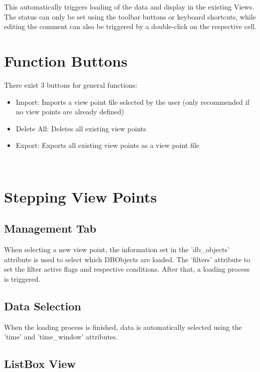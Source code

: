 This automatically triggers loading of the data and display in the existing Views. \\

The status can only be set using the toolbar buttons or keyboard shortcuts, while editing the comment can also be triggered by a double-click on the respective cell.

\section{Function Buttons}

There exist 3 buttons for general functions:

\begin{itemize}  
\item Import: Imports a view point file selected by the user (only recommended if no view points are already defined)
\item Delete All: Deletes all existing view points
\item Export: Exports all existing view points as a view point file
\end{itemize}
\ \\

\section{Stepping View Points}

\subsection{Management Tab} 
When selecting a new view point, the information set in the 'db\_objects' attribute is used to select which DBObjects are loaded. The 'filters' attribute to set the filter active flags and respective conditions. After that, a loading process is triggered. \\

\subsection{Data Selection}

When the loading process is finished, data is automatically selected using the 'time' and 'time\_window' attributes.

\subsection{ListBox View} 

